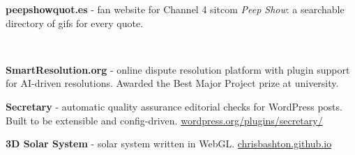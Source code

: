 \documentclass[10pt,a4paper,ragged2e,withhyper]{altacv}
\begin{document}
\begin{paracol}{2}
\vspace{\spacer}

\textbf{peepshowquot.es} - fan website for Channel 4 sitcom \emph{Peep Show}: a searchable directory of gifs for every quote.

\medskip

  \\

\vspace{\spacer}

\textbf{SmartResolution.org} - online dispute resolution platform with plugin support for AI-driven resolutions. Awarded the Best Major Project prize at university.

\medskip


\vspace{\spacer}

\textbf{Secretary} - automatic quality assurance editorial checks for WordPress posts. Built to be extensible and config-driven.
\newline
\href{https://wordpress.org/plugins/secretary/}{\url{wordpress.org/plugins/secretary/}}

\medskip


\medskip

\textbf{3D Solar System} - solar system written in WebGL.
\newline
\href{https://chrisbashton.github.io}{\url{chrisbashton.github.io}}

\medskip


\medskip



\customreferences

\end{paracol}
\end{document}
